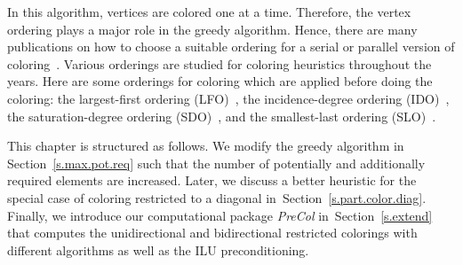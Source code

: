 \documentclass[12pt, twoside,a4paper,toc=bibliography]{scrbook}
\newcommand{\secref}[1]{Section~\protect\ref{#1}}
\begin{document}
In this algorithm, vertices are colored one at a time.
Therefore, the vertex ordering plays a major role in the greedy algorithm.
Hence, there are many publications on how to choose
a suitable ordering for a serial or parallel version of
coloring~\cite{ordering1,ordering2}.
Various orderings are studied for coloring heuristics
throughout the years. Here are some orderings for coloring which are applied before doing the coloring:
the largest-first ordering (LFO)~\cite{LFO}, the incidence-degree ordering (IDO)~\cite{IDO},
the saturation-degree ordering (SDO)~\cite{ordering2}, and the smallest-last ordering (SLO)~\cite{ordering1}.

This chapter is structured as follows.
We modify the greedy algorithm in \secref{s.max.pot.req}
such that the number of potentially and additionally required elements are increased.
Later, we discuss a better heuristic for
the special case of coloring restricted to a diagonal in~\secref{s.part.color.diag}.
Finally, we introduce our computational package \textit{PreCol}
in~\secref{s.extend} that computes the
unidirectional and bidirectional restricted colorings with different algorithms
as well as the ILU preconditioning.
\end{document}
